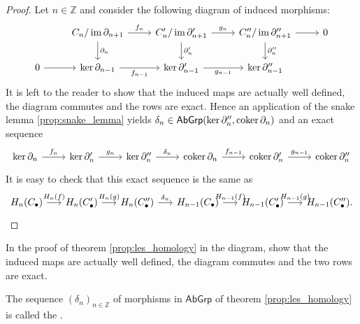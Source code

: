 \begin{proof}
	Let $n \in \mathbb{Z}$ and consider the following diagram of induced morphisms:
	\begin{equation}
		\label{eq:les_homology}
		\begin{tikzcd}
			& C_n/\im\partial_{n + 1} \arrow[r,"f_n"]\arrow[d,"\partial_n"] & C_n'/\im\partial'_{n + 1} \arrow[r,"g_n"]\arrow[d,"\partial'_n"] & C_n''/\im\partial_{n + 1}'' \arrow[r]\arrow[d,"\partial''_n"] & 0\\
			0 \arrow[r] & \ker \partial_{n - 1} \arrow[r,"f_{n - 1}"'] & \ker \partial_{n - 1}' \arrow[r,"g_{n - 1}"'] & \ker\partial_{n - 1}''
		\end{tikzcd}		
	\end{equation}
	It is left to the reader to show that the induced maps are actually well defined, the diagram commutes and the rows are exact. Hence an application of the snake lemma \ref{prop:snake_lemma} yields $\delta_n \in \mathsf{AbGrp}(\ker \partial_n'',\operatorname{coker} \partial_n)$ and an exact sequence
	\begin{equation*}
		\begin{tikzcd}
			\ker \partial_n \arrow[r,"f_n"] & \ker \partial_n' \arrow[r,"g_n"] & \ker \partial_n'' \arrow[r,"\delta_n"] & \coker \partial_n \arrow[r,"f_{n - 1}"] & \coker \partial_n' \arrow[r,"g_{n - 1}"] & \coker \partial_n''
		 \end{tikzcd}
	\end{equation*}
	It is easy to check that this exact sequence is the same as
	\begin{equation*}
		\begin{tikzcd}[column sep=3.5ex]
			H_n(C_\bullet) \arrow[r,"H_n(f)"] & H_n(C'_\bullet) \arrow[r,"H_n(g)"] & H_n(C''_\bullet) \arrow[r,"\delta_n"] & H_{n - 1}(C_\bullet) \arrow[r,"H_{n-1}(f)"] & H_{n - 1}(C_\bullet') \arrow[r,"H_{n-1}(g)"] & H_{n - 1}(C_\bullet'').
		 \end{tikzcd}
	\end{equation*}
\end{proof}

\begin{exercise}
	In the proof of theorem \ref{prop:les_homology} in the diagram, show that the induced maps are actually well defined, the diagram commutes and the two rows are exact.
\end{exercise}

\begin{definition}
	The sequence $(\delta_n)_{n \in \mathbb{Z}}$ of morphisms in $\mathsf{AbGrp}$ of theorem \ref{prop:les_homology} is called the .
\end{definition}

